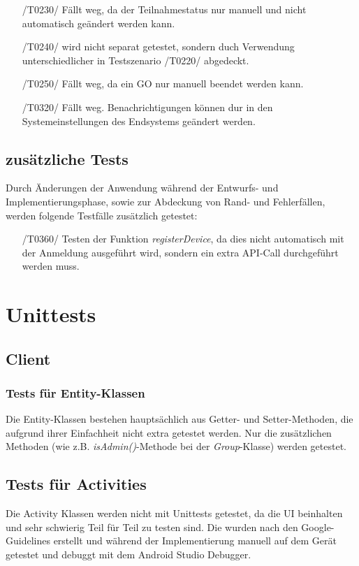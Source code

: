 \documentclass[11pt,a4paper]{scrartcl}
\begin{document}
\begin{itemize}
	\item[/T0230/] Fällt weg, da der Teilnahmestatus nur manuell und nicht automatisch geändert werden kann.
	
	\item[/T0240/] wird nicht separat getestet, sondern duch Verwendung unterschiedlicher in Testszenario /T0220/ abgedeckt.
	
	\item[/T0250/] Fällt weg, da ein GO nur manuell beendet werden kann.
	
	\item[/T0320/] Fällt weg. Benachrichtigungen können dur in den Systemeinstellungen des Endsystems geändert werden.
	
\end{itemize}

\subsection{zusätzliche Tests}
Durch Änderungen der Anwendung während der Entwurfs- und Implementierungsphase, sowie zur Abdeckung von Rand- und Fehlerfällen, werden folgende Testfälle zusätzlich getestet:
\begin{itemize}
	\item[/T0360/]\label{360} Testen der Funktion \textit{registerDevice}, da dies nicht automatisch mit der Anmeldung ausgeführt wird, sondern ein extra API-Call durchgeführt werden muss.
\end{itemize}

\newpage

\section{Unittests}

\subsection{Client}

\subsubsection{Tests für Entity-Klassen}
Die Entity-Klassen bestehen hauptsächlich aus Getter- und Setter-Methoden, die aufgrund ihrer Einfachheit nicht extra getestet werden. Nur die zusätzlichen Methoden (wie z.B. \textit{isAdmin()}-Methode bei der \textit{Group}-Klasse) werden getestet.

\subsection{Tests für Activities}
Die Activity Klassen werden nicht mit Unittests getestet, da die UI beinhalten und sehr schwierig Teil für Teil zu testen sind. Die wurden nach den Google-Guidelines erstellt und während der Implementierung manuell auf dem Gerät getestet und debuggt mit dem Android Studio Debugger.
\end{document}
